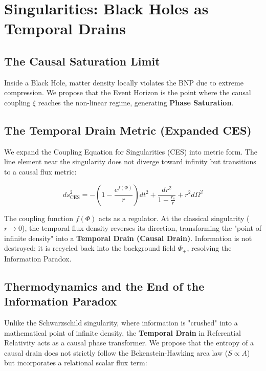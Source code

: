 \documentclass[12pt, a4paper]{article}
\begin{document}

\section{Singularities: Black Holes as Temporal Drains}

\subsection{The Causal Saturation Limit}

Inside a Black Hole, matter density locally violates the BNP due to extreme compression. We propose that the Event Horizon is the point where the causal coupling \(\xi\) reaches the non-linear regime, generating \textbf{Phase Saturation}.

\subsection{The Temporal Drain Metric (Expanded CES)}

We expand the Coupling Equation for Singularities (CES) into metric form. The line element near the singularity does not diverge toward infinity but transitions to a causal flux metric:

\[
ds^2_{\text{CES}} = -\left(1 - \frac{e^{f(\Phi)}}{r}\right) dt^2 + \frac{dr^2}{1 - \frac{r_s}{r}} + r^2 d\Omega^2
\]

The coupling function \(f(\Phi)\) acts as a regulator. At the classical singularity (\(r \to 0\)), the temporal flux density reverses its direction, transforming the "point of infinite density" into a \textbf{Temporal Drain (Causal Drain)}. Information is not destroyed; it is recycled back into the background field \(\Phi_{+}\), resolving the Information Paradox.

\subsection{Thermodynamics and the End of the Information Paradox}

Unlike the Schwarzschild singularity, where information is "crushed" into a mathematical point of infinite density, the \textbf{Temporal Drain} in Referential Relativity acts as a causal phase transformer. We propose that the entropy of a causal drain does not strictly follow the Bekenstein-Hawking area law (\(S \propto A\)) but incorporates a relational scalar flux term:
\end{document}
